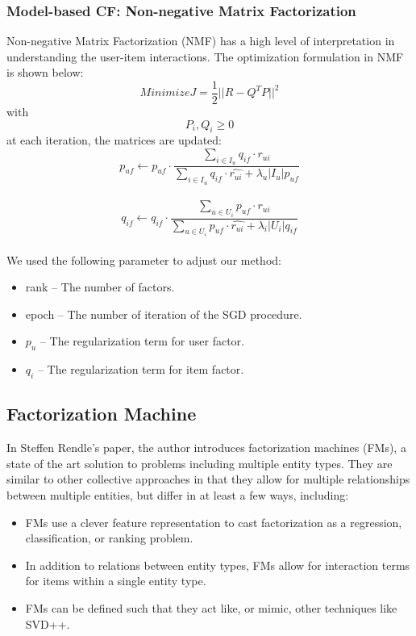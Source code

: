 \documentclass[journal]{IEEEtran}
\begin{document}
\subsubsection{Model-based CF: Non-negative Matrix Factorization}
Non-negative Matrix Factorization (NMF) has a high level of interpretation in understanding the user-item interactions. The optimization formulation in NMF is shown below:
$$Minimize J = \frac{1}{2}||R-Q^TP||^2$$ with  $$P_i, Q_i \ge 0$$ 
at each iteration, the matrices are updated:
$$p_{uf} \leftarrow p_{uf} \cdot \frac{\sum_{i \in I_u} q_{if}
\cdot r_{ui}}{\sum_{i \in I_u} q_{if} \cdot \hat{r_{ui}} +
\lambda_u |I_u| p_{uf}}$$\\
$$q_{if} \leftarrow q_{if} \cdot \frac{\sum_{u \in U_i} p_{uf}
\cdot r_{ui}}{\sum_{u \in U_i} p_{uf} \cdot \hat{r_{ui}} +
\lambda_i |U_i| q_{if}}$$\\
We used the following parameter to adjust our method:
\begin{itemize}
    \item rank – The number of factors. 
    \item epoch – The number of iteration of the SGD procedure. 
    \item $p_u$ – The regularization term for user factor.
    \item $q_i$ – The regularization term for item factor.
\end{itemize}

\subsection{Factorization Machine}
In Steffen Rendle's paper, the author introduces factorization machines (FMs), a state of the art solution to problems including multiple entity types. They are similar to other collective approaches in that they allow for multiple relationships between multiple entities, but differ in at least a few ways, including:
\begin{itemize}
    \item FMs use a clever feature representation to cast factorization as a regression, classification, or ranking problem.
    \item In addition to relations between entity types, FMs allow for interaction terms for items within a single entity type.
    \item FMs can be defined such that they act like, or mimic, other techniques like SVD++. 
\end{itemize}
\end{document}
